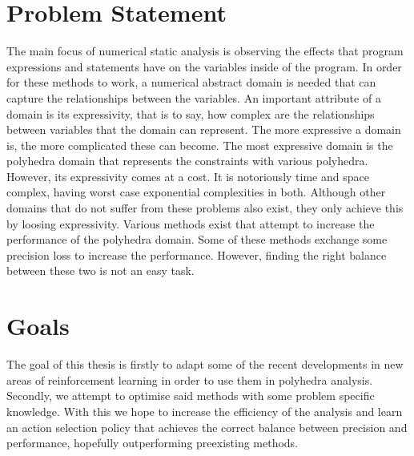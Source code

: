 \section{Problem Statement}
The main focus of numerical static analysis is observing the effects that program expressions and statements have on the variables inside of the program. In order for these methods to work, a numerical abstract domain is needed that can capture the relationships between the variables. An important attribute of a domain is its expressivity, that is to say, how complex are the relationships between variables that the domain can represent. The more expressive a domain is, the more complicated these can become. The most expressive domain is the polyhedra domain that represents the constraints with various polyhedra. However, its expressivity comes at a cost. It is notoriously time and space complex, having worst case exponential complexities in both. Although other domains that do not suffer from these problems also exist, they only achieve this by loosing expressivity. Various methods exist that attempt to increase the performance of the polyhedra domain. Some of these methods exchange some precision loss to increase the performance. However, finding the right balance between these two is not an easy task.

\section{Goals}
The goal of this thesis is firstly to adapt some of the recent developments in new areas of reinforcement learning in order to use them in polyhedra analysis. Secondly, we attempt to optimise said methods with some problem specific knowledge. With this we hope to increase the efficiency of the analysis and learn an action selection policy that achieves the correct balance between precision and performance, hopefully outperforming preexisting methods.

